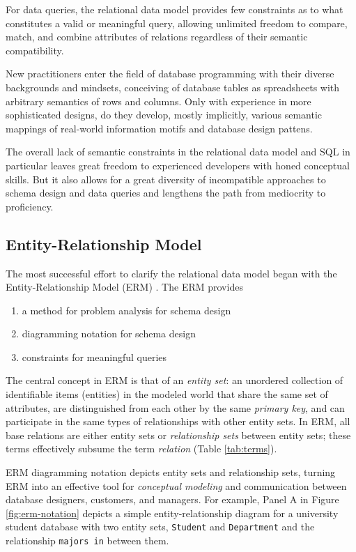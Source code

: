 \documentclass[letter,10pt]{article}
\begin{document}
For data queries, the relational data model provides few constraints as to what constitutes a valid or meaningful query, allowing unlimited freedom to compare, match, and combine attributes of relations regardless of their semantic compatibility.

New practitioners enter the field of database programming with their diverse backgrounds and mindsets, conceiving of database tables as spreadsheets with arbitrary semantics of rows and columns.  
Only with experience in more sophisticated designs, do they develop, mostly implicitly, various semantic mappings of real-world information motifs and database design pattens.

The overall lack of semantic constraints in the relational data model and SQL in particular leaves great freedom to experienced developers with honed conceptual skills. But it also allows for a great diversity of incompatible approaches to schema design and data queries and lengthens the path from mediocrity to proficiency.

\subsection{Entity-Relationship Model}
The most successful effort to clarify the relational data model began with the Entity-Relationship Model (ERM) \citep{chen_entity_1976}.  
The ERM provides 
\begin{enumerate}
\item a method for problem analysis for schema design 
\item diagramming notation for schema design 
\item constraints for meaningful queries
\end{enumerate}

The central concept in ERM is that of an {\em entity set}: an unordered collection of identifiable items (entities) in the modeled world that share the same set of attributes, are distinguished from each other by the same \emph{primary key}, and can participate in the same types of relationships with other entity sets. 
In ERM, all base relations are either entity sets or \emph{relationship sets} between entity sets; these terms effectively subsume the term \emph{relation} (Table \ref{tab:terms}).

ERM diagramming notation depicts entity sets and relationship sets, turning ERM into an effective tool for \emph{conceptual modeling} and communication between database designers, customers, and managers.
For example, Panel {\sf A} in Figure \ref{fig:erm-notation} depicts a simple entity-relationship diagram for a university student database with two entity sets, {\tt Student} and {\tt Department} and the relationship {\tt majors in} between them.
\end{document}
